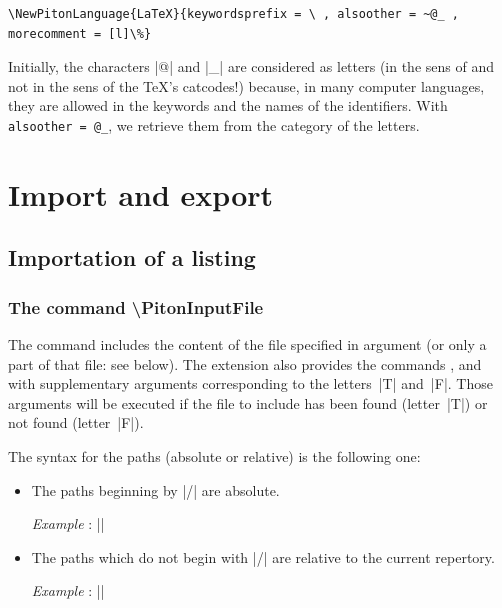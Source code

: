 \documentclass{article}
\begin{document}
\begin{Verbatim}
\NewPitonLanguage{LaTeX}{keywordsprefix = \ , alsoother = ~@_ , morecomment = [l]\%}
\end{Verbatim}

Initially, the characters |@| and |_| are considered as letters (in the
sens of  and not in the sens of the TeX's catcodes!) because,
in many computer languages, they are allowed in the keywords and the names
of the identifiers. With \verb|alsoother = @_|, we retrieve them from the
category of the letters. 

\section{Import and export}


\subsection{Importation of a listing}

\label{PitonInputFile}

\subsubsection{The command \textbackslash PitonInputFile}


The command  includes the content of the
file specified in argument (or only a part of that file: see below). The
extension  also provides the commands
,  and
 with supplementary arguments
corresponding to the letters~|T| and~|F|. Those arguments will be executed if
the file to include has been found (letter~|T|) or not found (letter~|F|).

\smallskip
The syntax for the paths (absolute or relative) is the following one:
\begin{itemize}
\item The paths beginning by |/| are absolute.

\emph{Example} : ||

\item The paths which do not begin with |/| are relative to the current
repertory. 

\emph{Example} : ||
\end{itemize}
\end{document}
